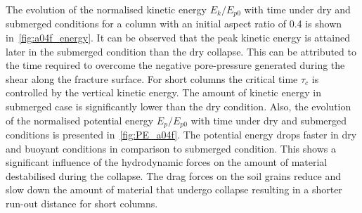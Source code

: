 The evolution of the normalised kinetic energy $E_k / E_{p0}$ with time under 
dry 
and submerged conditions for a column with an initial aspect ratio of 0.4 is 
shown in~\cref{fig:a04f_energy}. It can be 
observed that the peak kinetic energy is attained later in the submerged 
condition than the dry collapse. This can be attributed to the time required to 
overcome the negative pore-pressure generated during the shear along the 
fracture surface. For short columns the critical time $\tau_c$ is controlled by 
the vertical kinetic energy. The amount of kinetic energy in submerged case is 
significantly lower than the dry condition. Also, the evolution of the 
normalised potential energy $E_{p}/E_{p0}$ with time under dry and submerged 
conditions is presented in~\cref{fig:PE_a04f}. The potential energy drops 
faster in dry and buoyant conditions in comparison to submerged condition. This 
shows a significant influence of the hydrodynamic forces on the amount of 
material destabilised during the collapse. The drag forces on the soil grains 
reduce and slow down the amount of material that undergo collapse resulting in 
a shorter run-out distance for short columns. 
